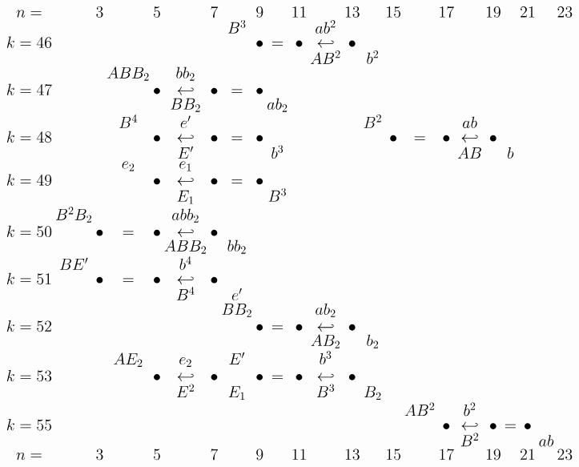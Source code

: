 \documentclass{article}
\begin{document}
\(
\begin{tikzcd}[
nodes={font=\Large,inner sep=0pt},
row sep=0.1cm,
column sep=0.1cm]
n= & & 3 & & 5 & & 7 & & 9 & & 11 & & 13 & & 15 & & 17 & & 19 & & 21 & & 23 \\
 & & & & & & & B^3 & & & & ab^2 \\
k=46 & & & & & & & & \bullet & = & \bullet & \hookleftarrow & \bullet \\
 & & & & & & & & & & & AB^2 & & b^2 \\
& & & ABB_2 & & bb_2 & & \\
k=47 & & & & \bullet & \hookleftarrow & \bullet & = & \bullet \\
 & & & & & BB_2 & & & & ab_2 \\ 
& & & B^4 & & e' && && && && B^2 && && ab  \\
k=48 & & & & \bullet & \hookleftarrow & \bullet & = & \bullet && && && \bullet & = & \bullet & \hookleftarrow & \bullet \\
 & & & & & E' && && b^3 && && && && AB && b \\
& && e_2 && e_1 && && && && \\
k=49 && && \bullet & \hookleftarrow & \bullet & = & \bullet \\
 & && && E_1 && && B^3 && && &&  \\ 
& B^2B_2 && && abb_2 && && && && && && && \\
k=50 && \bullet & = & \bullet & \hookleftarrow & \bullet && && && && && && && \\
& && && ABB_2 && bb_2 && && && && && && && \\
& BE' && && b^4 && && && && && && && \\
k=51 && \bullet & = & \bullet & \hookleftarrow & \bullet && && && && && && && \\
& && && B^4 && e' && && && && && && && \\
& && && && BB_2 && && ab_2 && && && && \\
k=52 && && && && \bullet & = & \bullet & \hookleftarrow & \bullet && && && && && && && \\
& && && && && && AB_2 && b_2 && && && \\
& && AE_2 && e_2 && E' && && b^3 && && && && \\
k=53 && && \bullet & \hookleftarrow & \bullet && \bullet & = & \bullet & \hookleftarrow & \bullet && && && && \\
& && && E^2 && E_1 && && B^3 && B_2 && && && && \\
& && && && && && && && AB^2 && b^2 &&  \\
k=55 && && && && && && && && \bullet & \hookleftarrow & \bullet & = & \bullet && && && && && && && \\
& && && && && && && && && B^2 && && ab \\
n= & & 3 & & 5 & & 7 & & 9 & & 11 & & 13 & & 15 & & 17 & & 19 & & 21 & & 23
\end{tikzcd}
\)
\end{document}
